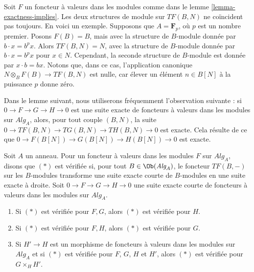\begin{example}
\label{example-module-structure-different}
Soit $F$ un foncteur à valeurs dans les modules comme dans le
lemme \ref{lemma-exactness-implies}.
Les deux structures de module sur
$TF(B, N)$ ne coïncident pas toujours. En voici un exemple. Supposons que $A = \mathbf{F}_p$,
où $p$ est un nombre premier. Posons $F(B) = B$, mais avec la structure de $B$-module
donnée par $b \cdot x = b^px$. Alors $TF(B, N) = N$, avec la structure de $B$-module
donnée par $b \cdot x = b^px$ pour $x \in N$. Cependant, la seconde structure de $B$-module
est donnée par $x \cdot b = bx$. Notons que, dans ce cas, l'application canonique
$N \otimes_B F(B) \to TF(B, N)$ est nulle, car élever un élément
$n \in B[N]$ à la puissance $p$ donne zéro.
\end{example}

\noindent
Dans le lemme suivant, nous utiliserons fréquemment l'observation suivante :
si $0 \to F \to G \to H \to 0$ est une suite exacte de foncteurs à valeurs dans les modules
sur $\textit{Alg}_A$, alors, pour tout couple $(B, N)$, la
suite $0 \to TF(B, N) \to TG(B, N) \to TH(B, N) \to 0$ est exacte.
Cela résulte de ce que $0 \to F(B[N]) \to G(B[N]) \to H(B[N]) \to 0$
est exacte.

\begin{lemma}
\label{lemma-exactness-permanence}
Soit $A$ un anneau. Pour un foncteur à valeurs dans les modules $F$ sur $\textit{Alg}_A$,
disons que $(*)$ est vérifiée si, pour tout $B \in \Ob(\textit{Alg}_A)$, le
foncteur $TF(B, -)$ sur les $B$-modules transforme une suite exacte courte
de $B$-modules en une suite exacte à droite. Soit
$0 \to F \to G \to H \to 0$ une suite exacte courte de
foncteurs à valeurs dans les modules sur $\textit{Alg}_A$.
\begin{enumerate}
\item Si $(*)$ est vérifiée pour $F, G$, alors $(*)$ est vérifiée pour $H$.
\item Si $(*)$ est vérifiée pour $F, H$, alors $(*)$ est vérifiée pour $G$.
\item Si $H' \to H$ est un morphisme de foncteurs à valeurs dans les modules sur $\textit{Alg}_A$
et si $(*)$ est vérifiée pour $F$, $G$, $H$ et $H'$, alors $(*)$ est vérifiée pour
$G \times_H H'$.
\end{enumerate}
\end{lemma}

